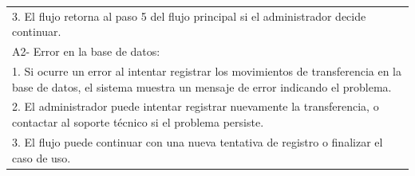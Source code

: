 \documentclass[stu, 12pt, letterpaper, donotrepeattitle, floatsintext, natbib]{apa7}
\begin{document}
\begin{longtable}{@{} p{16.5cm} @{}}
    \hspace{1cm}3. El flujo retorna al paso 5 del flujo principal si el administrador decide continuar.                                                                                                                                    \\
    A2- Error en la base de datos:                                                                                                                                                                                                         \\
    \hspace{1cm}1. Si ocurre un error al intentar registrar los movimientos de transferencia en la base de datos, el sistema muestra un mensaje de error indicando el problema.                                                            \\
    \hspace{1cm}2. El administrador puede intentar registrar nuevamente la transferencia, o contactar al soporte técnico si el problema persiste.                                                                                          \\
    \hspace{1cm}3. El flujo puede continuar con una nueva tentativa de registro o finalizar el caso de uso.                                                                                                                                \\ \bottomrule
\end{longtable}
\newpage
\end{document}
